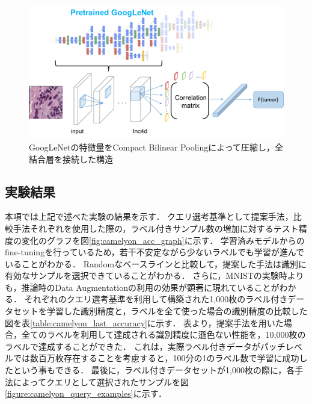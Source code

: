 \begin{figure}[t!]
  \begin{center}
   \includegraphics[width=12cm]{figures/googlenet_cbp.pdf}
  \end{center}
 \caption{\label{fig:googlenet_cbp}GoogLeNetの特徴量をCompact Bilinear Poolingによって圧縮し，全結合層を接続した構造}
\end{figure}

\subsection{実験結果}
本項では上記で述べた実験の結果を示す．
クエリ選考基準として提案手法，比較手法それぞれを使用した際の，ラベル付きサンプル数の増加に対するテスト精度の変化のグラフを図\ref{fig:camelyon_acc_graph}に示す．
学習済みモデルからのfine-tuningを行っているため，若干不安定ながら少ないラベルでも学習が進んでいることがわかる．
Randomなベースラインと比較して，提案した手法は識別に有効なサンプルを選択できていることがわかる．
さらに，MNISTの実験時よりも，推論時のData Augmentationの利用の効果が顕著に現れていることがわかる．
それぞれのクエリ選考基準を利用して構築された1,000枚のラベル付きデータセットを学習した識別精度と，ラベルを全て使った場合の識別精度の比較した図を表\ref{table:camelyon_last_accuracy}に示す．
表より，提案手法を用いた場合，全てのラベルを利用して達成される識別精度に遜色ない性能を，10,000枚のラベルで達成することができた．
これは，実際ラベル付きデータがパッチレベルでは数百万枚存在することを考慮すると，100分の1のラベル数で学習に成功したという事もできる．
最後に，ラベル付きデータセットが1,000枚の際に，各手法によってクエリとして選択されたサンプルを図\ref{figure:camelyon_query_examples}に示す．


